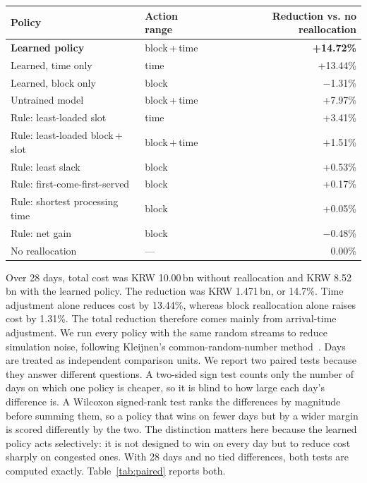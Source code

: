 \begin{center}
\begin{minipage}{\textwidth}
\centering
{}
\label{tab:policies}
\small
\begin{tabular}{@{}llr@{}}
\toprule
Policy & Action range & Reduction vs. no reallocation \\
\midrule
\textbf{Learned policy} & block\,+\,time & \textbf{+14.72\%} \\
Learned, time only & time & +13.44\% \\
Learned, block only & block & $-$1.31\% \\
\midrule
Untrained model & block\,+\,time & +7.97\% \\
\midrule
Rule: least-loaded slot & time & +3.41\% \\
Rule: least-loaded block\,+\,slot & block\,+\,time & +1.51\% \\
Rule: least slack & block & +0.53\% \\
Rule: first-come-first-served & block & +0.17\% \\
Rule: shortest processing time & block & +0.05\% \\
Rule: net gain & block & $-$0.48\% \\
\midrule
No reallocation & --- & 0.00\% \\
\bottomrule
\end{tabular}
\end{minipage}
\end{center}
Over 28 days, total cost was KRW 10.00\,bn without reallocation and KRW
8.52\,bn with the learned policy. The reduction was KRW 1.471\,bn, or
14.7\%. Time adjustment alone reduces cost by 13.44\%, whereas block
reallocation alone raises cost by 1.31\%. The total reduction therefore
comes mainly from arrival-time adjustment.
We run every policy with the same random streams to reduce simulation
noise, following Kleijnen's common-random-number method~\cite{ref22}.
Days are treated as independent comparison units. We report two paired
tests because they answer different questions. A two-sided sign test
counts only the number of days on which one policy is cheaper, so it is
blind to how large each day's difference is. A Wilcoxon signed-rank test
ranks the differences by magnitude before summing them, so a policy that
wins on fewer days but by a wider margin is scored differently by the
two. The distinction matters here because the learned policy acts
selectively: it is not designed to win on every day but to reduce cost
sharply on congested ones. With 28 days and no tied differences, both
tests are computed exactly. Table~\ref{tab:paired} reports both.

